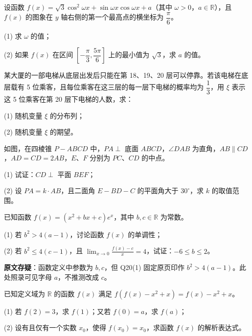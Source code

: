 \begin{question}
设函数 \(f(x)=\sqrt3\cos^2\omega x+\sin\omega x\cos\omega x+a\)（其中 \(\omega>0\)，\(a\in\mathbb R\)），且 \(f(x)\) 的图象在 \(y\) 轴右侧的第一个最高点的横坐标为 \(\dfrac\pi6\)。

(1) 求 \(\omega\) 的值；

(2) 如果 \(f(x)\) 在区间 \(\left[-\dfrac\pi3,\dfrac{5\pi}6\right]\) 上的最小值为 \(\sqrt3\)，求 \(a\) 的值。

\end{question}
\begin{question}
某大厦的一部电梯从底层出发后只能在第 18、19、20 层可以停靠。若该电梯在底层载有 5 位乘客，且每位乘客在这三层的每一层下电梯的概率均为 \(\dfrac13\)，用 \(\xi\) 表示这 5 位乘客在第 20 层下电梯的人数，求：

(1) 随机变量 \(\xi\) 的分布列；

(2) 随机变量 \(\xi\) 的期望。

\Needspace{0.4\textheight}
\end{question}
\begin{question}
如图，在四棱锥 \(P-ABCD\) 中，\(PA\perp\) 底面 \(ABCD\)，\(\angle DAB\) 为直角，\(AB\parallel CD\)，\(AD=CD=2AB\)，$E\text{、}F$ 分别为 $PC\text{、}CD$ 的中点。
\nopagebreak[4]
\begin{center}\end{center}
\nopagebreak[4]
(1) 试证：\(CD\perp\) 平面 \(BEF\)；

(2) 设 \(PA=k\cdot AB\)，且二面角 \(E-BD-C\) 的平面角大于 \(30^\circ\)，求 \(k\) 的取值范围。

\end{question}
\begin{question}
已知函数 \(f(x)=(x^2+bx+c)e^x\)，其中 \(b,c\in\mathbb R\) 为常数。

(1) 若 \(b^2>4(a-1)\)，讨论函数 \(f(x)\) 的单调性；

(2) 若 \(b^2\leq4(c-1)\)，且 \(\displaystyle\lim_{x\to0}\frac{f(x)-c}{x}=4\)，试证：\(-6\leq b\leq2\)。

\begin{gktip}
\textbf{原文存疑}：函数定义中参数为 $b,c$，但 Q20(1) 固定原页印作 $b^2>4(a-1)$。此处照录可见字母 $a$，不推测改成 $c$。
\end{gktip}

\end{question}
\begin{question}
已知定义域为 \(\mathbb R\) 的函数 \(f(x)\) 满足 \(f(f(x)-x^2+x)=f(x)-x^2+x\)。

(1) 若 \(f(2)=3\)，求 \(f(1)\)；又若 \(f(0)=a\)，求 \(f(a)\)；

(2) 设有且仅有一个实数 \(x_0\)，使得 \(f(x_0)=x_0\)，求函数 \(f(x)\) 的解析表达式。

\Needspace{0.4\textheight}
\end{question}
